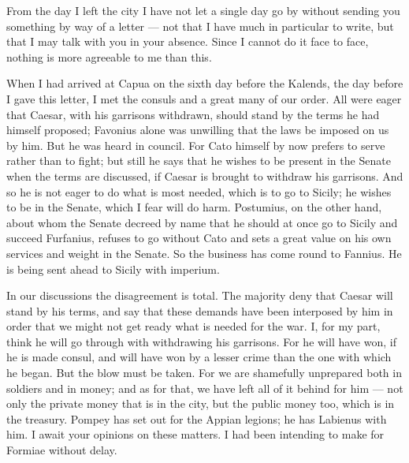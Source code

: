 

 From the day I left the city I have not let a single day go by without sending you something by way of a letter --- not that I have much in particular to write, but that I may talk with you in your absence. Since I cannot do it face to face, nothing is more agreeable to me than this.

 When I had arrived at Capua on the sixth day before the Kalends, the day before I gave this letter, I met the consuls and a great many of our order. All were eager that Caesar, with his garrisons withdrawn, should stand by the terms he had himself proposed; Favonius alone was unwilling that the laws be imposed on us by him. But \textdagger{}he was heard in\textdagger{} council. For Cato himself by now prefers to serve rather than to fight; but still he says that he wishes to be present in the Senate when the terms are discussed, if Caesar is brought to withdraw his garrisons. And so he is not eager to do what is most needed, which is to go to Sicily; he wishes to be in the Senate, which I fear will do harm. Postumius, on the other hand, about whom the Senate decreed by name that he should at once go to Sicily and succeed Furfanius, refuses to go without Cato and sets a great value on his own services and weight in the Senate. So the business has come round to Fannius. He is being sent ahead to Sicily with imperium.

 In our discussions the disagreement is total. The majority deny that Caesar will stand by his terms, and say that these demands have been interposed by him in order that we might not get ready what is needed for the war. I, for my part, think he will go through with withdrawing his garrisons. For he will have won, if he is made consul, and will have won by a lesser crime than the one with which he began. But the blow must be taken. For we are shamefully unprepared both in soldiers and in money; and as for that, we have left all of it behind for him --- not only the private money that is in the city, but the public money too, which is in the treasury. Pompey has set out for the Appian legions; he has Labienus with him. I await your opinions on these matters. I had been intending to make for Formiae without delay.
